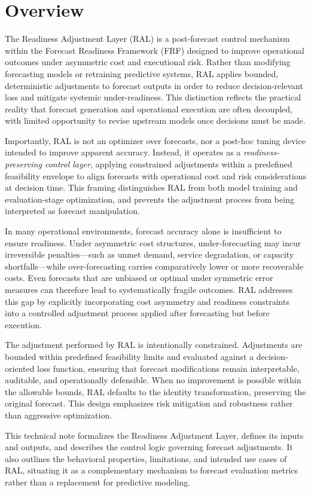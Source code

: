 \section{Overview}

The Readiness Adjustment Layer (RAL) is a post-forecast control mechanism within
the Forecast Readiness Framework (FRF) designed to improve operational outcomes
under asymmetric cost and executional risk. Rather than modifying forecasting
models or retraining predictive systems, RAL applies bounded, deterministic
adjustments to forecast outputs in order to reduce decision-relevant loss and
mitigate systemic under-readiness. This distinction reflects the practical reality
that forecast generation and operational execution are often decoupled, with
limited opportunity to revise upstream models once decisions must be made.

Importantly, RAL is not an optimizer over forecasts, nor a post-hoc tuning device
intended to improve apparent accuracy. Instead, it operates as a
\emph{readiness-preserving control layer}, applying constrained adjustments within
a predefined feasibility envelope to align forecasts with operational cost and
risk considerations at decision time. This framing distinguishes RAL from both
model training and evaluation-stage optimization, and prevents the adjustment
process from being interpreted as forecast manipulation.

In many operational environments, forecast accuracy alone is insufficient to
ensure readiness. Under asymmetric cost structures, under-forecasting may incur
irreversible penalties—such as unmet demand, service degradation, or capacity
shortfalls—while over-forecasting carries comparatively lower or more recoverable
costs. Even forecasts that are unbiased or optimal under symmetric error measures
can therefore lead to systematically fragile outcomes. RAL addresses this gap by
explicitly incorporating cost asymmetry and readiness constraints into a controlled
adjustment process applied after forecasting but before execution.

The adjustment performed by RAL is intentionally constrained. Adjustments are
bounded within predefined feasibility limits and evaluated against a
decision-oriented loss function, ensuring that forecast modifications remain
interpretable, auditable, and operationally defensible. When no improvement is
possible within the allowable bounds, RAL defaults to the identity transformation,
preserving the original forecast. This design emphasizes risk mitigation and
robustness rather than aggressive optimization.

This technical note formalizes the Readiness Adjustment Layer, defines its inputs
and outputs, and describes the control logic governing forecast adjustments. It
also outlines the behavioral properties, limitations, and intended use cases of
RAL, situating it as a complementary mechanism to forecast evaluation metrics
rather than a replacement for predictive modeling.
